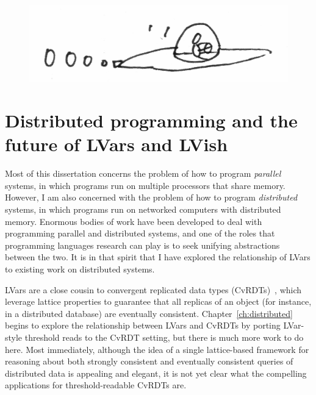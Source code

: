 \ifdefined\DISSERTATION
\begin{figure}[h]
  \vspace{-1em}
  \begin{center}
    \includegraphics[scale=0.15]{../illustrations/flying-saucer}
  \end{center}
  \vspace{-1em}
\end{figure}
\fi

\ifdefined\DISSERTATION
\section{Distributed programming and the future of LVars and LVish}

Most of this dissertation concerns the problem of how to program
\emph{parallel} systems, in which programs run on multiple processors
that share memory.  However, I am also concerned with the problem of
how to program \emph{distributed} systems, in which programs run on
networked computers with distributed memory.  Enormous bodies of work
have been developed to deal with programming parallel and distributed
systems, and one of the roles that programming languages research can
play is to seek unifying abstractions between the two. It is in that
spirit that I have explored the relationship of LVars to existing work
on distributed systems.

LVars are a close cousin to convergent replicated data types
(CvRDTs)~\cite{crdts,crdts-tr}, which leverage lattice properties to
guarantee that all replicas of an object (for instance, in a
distributed database) are eventually consistent.
Chapter~\ref{ch:distributed} begins to explore the relationship
between LVars and CvRDTs by porting LVar-style threshold reads to the
CvRDT setting, but there is much more work to do here.  Most
immediately, although the idea of a single lattice-based framework for
reasoning about both strongly consistent and eventually consistent
queries of distributed data is appealing and elegant, it is not yet
clear what the compelling applications for threshold-readable CvRDTs
are.

